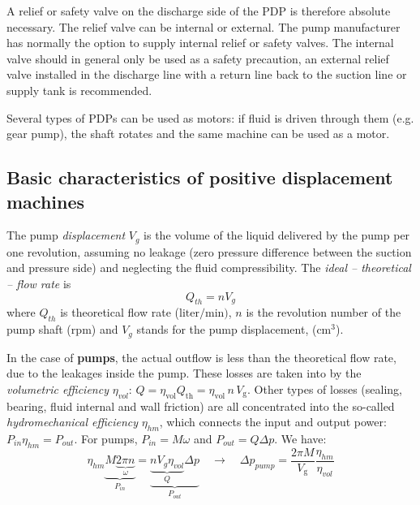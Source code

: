 A relief or safety valve on the discharge side of the PDP is therefore absolute necessary. The relief valve can be internal or external. The pump manufacturer has normally the option to supply internal relief or safety valves. The internal valve should in general only be used as a safety precaution, an external relief valve installed in the discharge line with a return line back to the suction line or supply tank is recommended.

Several types of PDPs can be used as motors: if fluid is driven through them (e.g. gear pump), the shaft rotates and the same machine can be used as a motor.

\clearpage

\subsection{Basic characteristics of positive displacement machines}

The pump \emph{displacement} $V_g$ is the volume of the liquid delivered by the pump per one revolution, assuming no leakage (zero pressure difference between the suction and pressure side) and neglecting the fluid compressibility. The \emph{ideal -- theoretical -- flow rate} is
%
\begin{equation}
Q_{th}=n V_g
\label{eq:Qth}
\end{equation}
%
where $Q_{th}$ is theoretical flow rate ($\mathrm{liter/min})$, $n$ is the revolution number of the pump shaft ($\mathrm{rpm}$) and $V_g$ stands for the pump displacement, ($\mathrm{cm^3}$). 

In the case of {\bf pumps}, the actual outflow is less than the theoretical flow rate, due to the leakages inside the pump. These losses are taken into by the \emph{volumetric efficiency} $\eta_{vol}$: $Q=\eta_{\mathrm{vol}} Q_{\mathrm{th}} = \eta_{\mathrm{vol}}\, n\,  V_{\mathrm{g}}$. Other types of losses (sealing, bearing, fluid internal and wall friction) are all concentrated into the so-called \emph{hydromechanical efficiency} $\eta_{hm}$, which connects the input and output power: $P_{in} \eta_{hm}=P_{out}$. For pumps, $P_{in}=M \omega$ and $P_{out}=Q \Delta p$. We have:
%
\begin{equation}
\eta_{hm} \underbrace{M \underbrace{2\pi n}_{\omega}}_{P_{in}}=\underbrace{\underbrace{n V_g \eta_{vol}}_Q\Delta p}_{P_{out}}
\quad \rightarrow \quad
\Delta p_{pump}=\frac{2\pi M}{V_{\mathrm{g}}}\frac{\eta_{hm}}{\eta_{vol}}
\end{equation}


